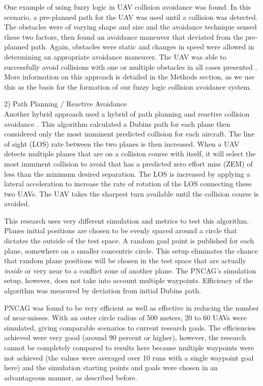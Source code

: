 \documentclass[10pt, conference, compsocconf]{IEEEtran}
\begin{document}
One example of using fuzzy logic in UAV collision avoidance was found. In this scenario, a pre-planned path for the UAV was used until a collision was detected.  The obstacles were of varying shape and size and the avoidance technique sensed these two factors, then found an avoidance maneuver that deviated from the pre-planned path. Again, obstacles were static and changes in speed were allowed in determining an appropriate avoidance maneuver.  The UAV was able to successfully avoid collisions with one or multiple obstacles in all cases presented \cite{dong2005path}. More information on this approach is detailed in the Methods section, as we use this as the basis for the formation of our fuzzy logic collision avoidance system. 

2) Path Planning / Reactive Avoidance \\
Another hybrid approach used a hybrid of path planning and reactive collision avoidance \cite{manathara2011reactive}. This algorithm calculated a Dubins path for each plane then considered only the most imminent predicted collision for each aircraft. The line of sight (LOS) rate between the two planes is then increased. When a UAV detects multiple planes that are on a collision course with itself, it will select the most imminent collision to avoid that has a predicted zero effort miss (ZEM) of less than the minimum desired separation. The LOS is increased by applying a lateral acceleration to increase the rate of rotation of the LOS connecting these two UAVs. The UAV takes the sharpest turn available until the collision course is avoided.

This research uses very different simulation and metrics to test this algorithm. Planes initial positions are chosen to be evenly spaced around a circle that dictates the outside of the test space. A random goal point is published for each plane, somewhere on a smaller concentric circle. This setup eliminates the chance that random plane positions will be chosen in the test space that are actually {\it inside} or very near to a conflict zone of another plane. The PNCAG's simulation setup, however, does not take into account multiple waypoints. Efficiency of the algorithm was measured by deviation from initial Dubins path. 

PNCAG was found to be very efficient as well as effective in reducing the number of near-misses. With an outer circle radius of 500 meters, 20 to 60 UAVs were simulated, giving comparable scenarios to current research goals. The efficiencies achieved were very good (around 90 percent or higher), however, the research cannot be completely compared to results here because multiple waypoints were not achieved (the values were averaged over 10 runs with a single waypoint goal here) and the simulation starting points and goals were chosen in an advantageous manner, as described before.
\end{document}
